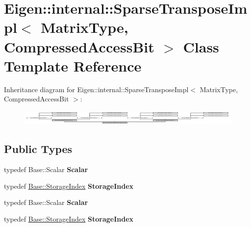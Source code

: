 \hypertarget{class_eigen_1_1internal_1_1_sparse_transpose_impl_3_01_matrix_type_00_01_compressed_access_bit_01_4}{}\section{Eigen\+:\+:internal\+:\+:Sparse\+Transpose\+Impl$<$ Matrix\+Type, Compressed\+Access\+Bit $>$ Class Template Reference}
\label{class_eigen_1_1internal_1_1_sparse_transpose_impl_3_01_matrix_type_00_01_compressed_access_bit_01_4}
Inheritance diagram for Eigen\+:\+:internal\+:\+:Sparse\+Transpose\+Impl$<$ Matrix\+Type, Compressed\+Access\+Bit $>$\+:\begin{figure}[H]
\begin{center}
\leavevmode
\includegraphics[height=0.779510cm]{class_eigen_1_1internal_1_1_sparse_transpose_impl_3_01_matrix_type_00_01_compressed_access_bit_01_4}
\end{center}
\end{figure}
\subsection*{Public Types}
\begin{DoxyCompactItemize}
\item 
\mbox{\label{class_eigen_1_1internal_1_1_sparse_transpose_impl_3_01_matrix_type_00_01_compressed_access_bit_01_4_a1b4691c1642c270f2d965fc0d279b56a}} 
typedef Base\+::\+Scalar {\bfseries Scalar}
\item 
\mbox{\label{class_eigen_1_1internal_1_1_sparse_transpose_impl_3_01_matrix_type_00_01_compressed_access_bit_01_4_a4062a1c89d1858f3bddb72a74cda910c}} 
typedef \hyperlink{group___sparse_core___module_a0b540ba724726ebe953f8c0df06081ed}{Base\+::\+Storage\+Index} {\bfseries Storage\+Index}
\item 
\mbox{\label{class_eigen_1_1internal_1_1_sparse_transpose_impl_3_01_matrix_type_00_01_compressed_access_bit_01_4_a1b4691c1642c270f2d965fc0d279b56a}} 
typedef Base\+::\+Scalar {\bfseries Scalar}
\item 
\mbox{\label{class_eigen_1_1internal_1_1_sparse_transpose_impl_3_01_matrix_type_00_01_compressed_access_bit_01_4_a4062a1c89d1858f3bddb72a74cda910c}} 
typedef \hyperlink{group___sparse_core___module_a0b540ba724726ebe953f8c0df06081ed}{Base\+::\+Storage\+Index} {\bfseries Storage\+Index}
\end{DoxyCompactItemize}
